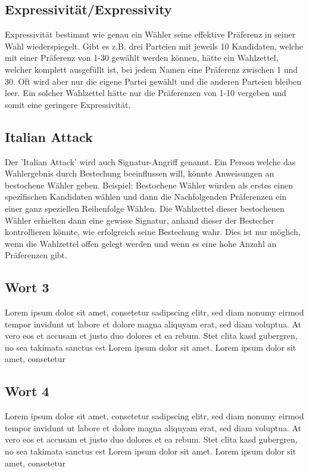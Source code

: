 \documentclass[10pt,a4paper]{article} %
\begin{document}
\begin{multicols}{2}

\subsection*{Expressivität/Expressivity}
Expressivität bestimmt wie genau ein Wähler seine effektive Präferenz in seiner Wahl wiederspiegelt. Gibt es z.B. drei Parteien mit jeweils 10 Kandidaten, welche mit einer Präferenz von 1-30 gewählt werden können, hätte ein Wahlzettel, welcher komplett ausgefüllt ist, bei jedem Namen eine Präferenz zwischen 1 und 30. Oft wird aber nur die eigene Partei gewählt und die anderen Parteien bleiben leer. Ein solcher Wahlzettel hätte nur die Präferenzen von 1-10 vergeben und somit eine geringere Expressivität.
 
\subsection*{Italian Attack}
Der 'Italian Attack' wird auch Signatur-Angriff genannt. Ein Person welche das Wahlergebnis durch Bestechung beeinflussen will, könnte Anweisungen an bestochene Wähler geben. Beispiel: Bestochene Wähler würden als erstes einen spezifischen Kandidaten wählen und dann die Nachfolgenden Präferenzen ein einer ganz speziellen Reihenfolge Wählen. Die Wahlzettel dieser bestochenen Wähler erhielten dann eine gewisse Signatur, anhand dieser der Bestecher kontrollieren könnte, wie erfolgreich seine Bestechung wahr. Dies ist nur möglich, wenn die Wahlzettel offen gelegt werden und wenn es eine hohe Anzahl an Präferenzen gibt.
 
\subsection*{Wort 3}
Lorem ipsum dolor sit amet, consetetur sadipscing elitr, sed diam nonumy eirmod tempor invidunt ut labore et dolore magna aliquyam erat, sed diam voluptua. At vero eos et accusam et justo duo dolores et ea rebum. Stet clita kasd gubergren, no sea takimata sanctus est Lorem ipsum dolor sit amet. Lorem ipsum dolor sit amet, consetetur 
  
\subsection*{Wort 4}
Lorem ipsum dolor sit amet, consetetur sadipscing elitr, sed diam nonumy eirmod tempor invidunt ut labore et dolore magna aliquyam erat, sed diam voluptua. At vero eos et accusam et justo duo dolores et ea rebum. Stet clita kasd gubergren, no sea takimata sanctus est Lorem ipsum dolor sit amet. Lorem ipsum dolor sit amet, consetetur 


\end{multicols}
\end{document}
